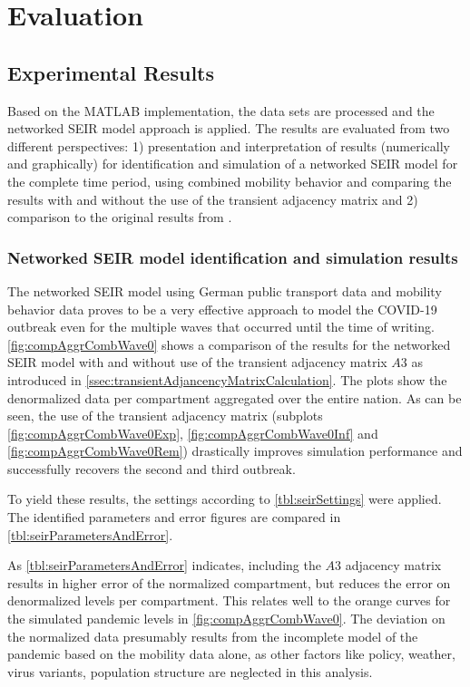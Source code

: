 \section{Evaluation}\label{sec:evaluation}

\subsection{Experimental Results}
Based on the MATLAB implementation, the data sets are processed and the networked SEIR model approach is applied. The results are evaluated from two different perspectives: 1) presentation and interpretation of results (numerically and graphically) for identification and simulation of a networked SEIR model for the complete time period, using combined mobility behavior and comparing the results with and without the use of the transient adjacency matrix and 2) comparison to the original results from \cite{vrabacCapturingEffectsTransportation2020}.

\subsubsection{Networked SEIR model identification and simulation results}
The networked SEIR model using German public transport data and mobility behavior data proves to be a very effective approach to model the COVID-19 outbreak even for the multiple waves that occurred until the time of writing. \autoref{fig:compAggrCombWave0} shows a comparison of the results for the networked SEIR model with and without use of the transient adjacency matrix $A3$ as introduced in \autoref{ssec:transientAdjancencyMatrixCalculation}. The plots show the denormalized data per compartment aggregated over the entire nation. As can be seen, the use of the transient adjacency matrix (subplots \autoref{fig:compAggrCombWave0Exp}, \autoref{fig:compAggrCombWave0Inf} and \autoref{fig:compAggrCombWave0Rem}) drastically improves simulation performance and successfully recovers the second and third outbreak.

To yield these results, the settings according to \autoref{tbl:seirSettings} were applied. The identified parameters and error figures are compared in \autoref{tbl:seirParametersAndError}.

As \autoref{tbl:seirParametersAndError} indicates, including the $A3$ adjacency matrix results in higher error of the normalized compartment, but reduces the error on denormalized levels per compartment. This relates well to the orange curves for the simulated pandemic levels in \autoref{fig:compAggrCombWave0}. The deviation on the normalized data presumably results from the incomplete model of the pandemic based on the mobility data alone, as other factors like policy, weather, virus variants, population structure are neglected in this analysis.

